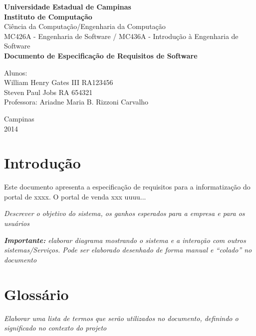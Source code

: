 \documentclass[12pt,a4paper]{article}
\begin{document}

\begin{titlepage}
\begin{center}
{\huge \textbf{Universidade Estadual de Campinas}}\\[0.2cm]
{\huge \textbf{Instituto de Computação}}\\[0.2cm]
{\large Ciência da Computação/Engenharia da Computação}\\[0.2cm]
{\large MC426A - Engenharia de Software / MC436A - Introdução à Engenharia de Software}\\[5.1cm]
{\bf \huge Documento de Especificação de Requisitos de Software}\\[5.1cm]
\end{center}
{\large Alunos:\\William Henry Gates III RA123456\\ Steven Paul Jobs RA 654321}\\[0.7cm]
{\large Professora: Ariadne Maria B. Rizzoni Carvalho}\\[3.1cm]
\begin{center}
{\large Campinas}\\[0.2cm]
{\large 2014}
\end{center}
\end{titlepage}


\tableofcontents
\afterpage{\cfoot{\thepage}}

\newpage

\section{Introdução}

Este documento apresenta a especificação de requisitos para a informatização do portal de xxxx.  O portal de venda xxx uuuu...

\textit{Descrever o objetivo do sistema, os ganhos esperados para a empresa e para os usuários}

\textit{\textbf{Importante:} elaborar diagrama mostrando o sistema e a interação com outros sistemas/Serviços. Pode ser elaborado desenhado de forma manual e “colado” no documento} 


\section{Glossário}
\textit{Elaborar uma lista de termos que serão utilizados no documento, definindo o significado no contexto do projeto}
\end{document}
